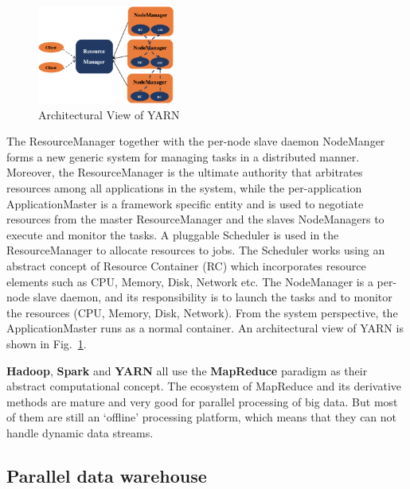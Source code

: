 \documentclass[	DIV=calc,%
							paper=a4,%
							fontsize=11pt,%
							twocolumn]{scrartcl}	 					%
\begin{document}
\begin{figure}
  \centering
    \includegraphics[width=0.4\textwidth]{images/YARN.png}
    \caption{Architectural View of YARN}
    \label{fig:YARN}   
\end{figure}

The ResourceManager together with the per-node slave daemon NodeManger forms a new generic system for managing tasks in a distributed manner. Moreover, the ResourceManager is the ultimate authority that arbitrates resources among all applications in the system, while the per-application ApplicationMaster is a framework specific entity and is used to negotiate resources from the master ResourceManager and the slaves NodeManagers to execute and monitor the tasks. A pluggable Scheduler is used in the ResourceManager to allocate resources to jobs. The Scheduler works using an abstract concept of Resource Container (RC) which incorporates resource elements such as CPU, Memory, Disk, Network etc. The NodeManager is a per-node slave daemon, and its responsibility is to launch the tasks and to monitor the resources (CPU, Memory, Disk, Network). From the system perspective, the ApplicationMaster runs as a normal container.
An architectural view of YARN is shown in Fig.~\ref{fig:YARN}.

\textbf{Hadoop}, \textbf{Spark} and \textbf{YARN} all use the \textbf{MapReduce} paradigm as their abstract computational concept. The ecosystem of MapReduce and its derivative methods are mature and very good for parallel processing of big data. But most of them are still an `offline' processing platform, which means that they can not handle dynamic data streams.



\subsection*{Parallel data warehouse}
\end{document}
